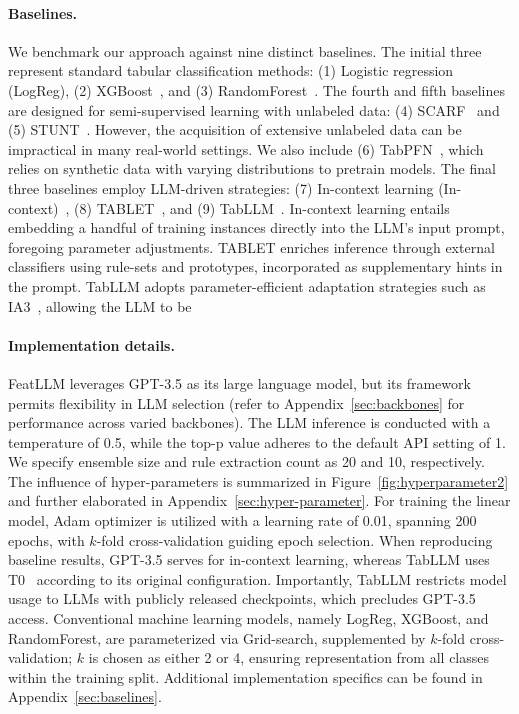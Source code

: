 \vspace*{-0.12in}
\paragraph{Baselines.}
We benchmark our approach against nine distinct baselines. The initial three represent standard tabular classification methods: (1) Logistic regression (LogReg), (2) XGBoost~\cite{chen2016xgboost}, and (3) RandomForest~\cite{ho1995random}. The fourth and fifth baselines are designed for semi-supervised learning with unlabeled data: (4) SCARF~\cite{bahri2022scarf} and (5) STUNT~\cite{nam2023stunt}. However, the acquisition of extensive unlabeled data can be impractical in many real-world settings. We also include (6) TabPFN~\cite{hollmann2022tabpfn}, which relies on synthetic data with varying distributions to pretrain models. The final three baselines employ LLM-driven strategies: (7) In-context learning (In-context)~\cite{wei2022emergent}, (8) TABLET~\cite{slack2023tablet}, and (9) TabLLM~\cite{hegselmann2023tabllm}. In-context learning entails embedding a handful of training instances directly into the LLM’s input prompt, foregoing parameter adjustments. TABLET enriches inference through external classifiers using rule-sets and prototypes, incorporated as supplementary hints in the prompt. TabLLM adopts parameter-efficient adaptation strategies such as IA3~\cite{liu2022few}, allowing the LLM to be

\vspace*{-0.12in}
\paragraph{Implementation details.}
\textsf{FeatLLM} leverages GPT-3.5 as its large language model, but its framework permits flexibility in LLM selection (refer to Appendix~\ref{sec:backbones} for performance across varied backbones). The LLM inference is conducted with a temperature of 0.5, while the top-p value adheres to the default API setting of 1. We specify ensemble size and rule extraction count as 20 and 10, respectively. The influence of hyper-parameters is summarized in Figure~\ref{fig:hyperparameter2} and further elaborated in Appendix~\ref{sec:hyper-parameter}.
For training the linear model, Adam optimizer is utilized with a learning rate of 0.01, spanning 200 epochs, with $k$-fold cross-validation guiding epoch selection. When reproducing baseline results, GPT-3.5 serves for in-context learning, whereas TabLLM uses T0~\cite{sanh2022multitask} according to its original configuration. Importantly, TabLLM restricts model usage to LLMs with publicly released checkpoints, which precludes GPT-3.5 access. Conventional machine learning models, namely LogReg, XGBoost, and RandomForest, are parameterized via Grid-search, supplemented by $k$-fold cross-validation; $k$ is chosen as either 2 or 4, ensuring representation from all classes within the training split. Additional implementation specifics can be found in Appendix~\ref{sec:baselines}.

